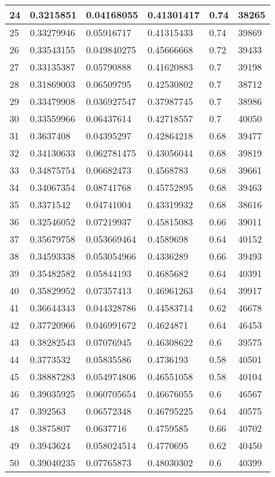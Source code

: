 \begin{longtable}{|l|l|l|l|l|l|}
24 & 0.3215851 & 0.04168055 & 0.41301417 & 0.74 & 38265 \\ \hline 
25 & 0.33279946 & 0.05916717 & 0.41315433 & 0.74 & 39869 \\ \hline 
26 & 0.33543155 & 0.049840275 & 0.45666668 & 0.72 & 39433 \\ \hline 
27 & 0.33135387 & 0.05790888 & 0.41620883 & 0.7 & 39198 \\ \hline 
28 & 0.31869003 & 0.06509795 & 0.42530802 & 0.7 & 38712 \\ \hline 
29 & 0.33479908 & 0.036927547 & 0.37987745 & 0.7 & 38986 \\ \hline 
30 & 0.33559966 & 0.06437614 & 0.42718557 & 0.7 & 40050 \\ \hline 
31 & 0.3637408 & 0.04395297 & 0.42864218 & 0.68 & 39477 \\ \hline 
32 & 0.34130633 & 0.062781475 & 0.43056044 & 0.68 & 39819 \\ \hline 
33 & 0.34875754 & 0.06682473 & 0.4568783 & 0.68 & 39661 \\ \hline 
34 & 0.34067354 & 0.08741768 & 0.45752895 & 0.68 & 39463 \\ \hline 
35 & 0.3371542 & 0.04741004 & 0.43319932 & 0.68 & 38616 \\ \hline 
36 & 0.32546052 & 0.07219937 & 0.45815083 & 0.66 & 39011 \\ \hline 
37 & 0.35679758 & 0.053669464 & 0.4589698 & 0.64 & 40152 \\ \hline 
38 & 0.34593338 & 0.053054966 & 0.4336289 & 0.66 & 39493 \\ \hline 
39 & 0.35482582 & 0.05844193 & 0.4685682 & 0.64 & 40391 \\ \hline 
40 & 0.35829952 & 0.07357413 & 0.46961263 & 0.64 & 39917 \\ \hline 
41 & 0.36644343 & 0.044328786 & 0.44583714 & 0.62 & 46678 \\ \hline 
42 & 0.37720966 & 0.046991672 & 0.4624871 & 0.64 & 46453 \\ \hline 
43 & 0.38282543 & 0.07076945 & 0.46308622 & 0.6 & 39575 \\ \hline 
44 & 0.3773532 & 0.05835586 & 0.4736193 & 0.58 & 40501 \\ \hline 
45 & 0.38887283 & 0.054974806 & 0.46551058 & 0.58 & 40104 \\ \hline 
46 & 0.39035925 & 0.060705654 & 0.46676055 & 0.6 & 46567 \\ \hline 
47 & 0.392563 & 0.06572348 & 0.46795225 & 0.64 & 40575 \\ \hline 
48 & 0.3875807 & 0.0637716 & 0.4759585 & 0.66 & 40702 \\ \hline 
49 & 0.3943624 & 0.058024514 & 0.4770695 & 0.62 & 40450 \\ \hline 
50 & 0.39040235 & 0.07765873 & 0.48030302 & 0.6 & 40399 \\ \hline 
\end{longtable}